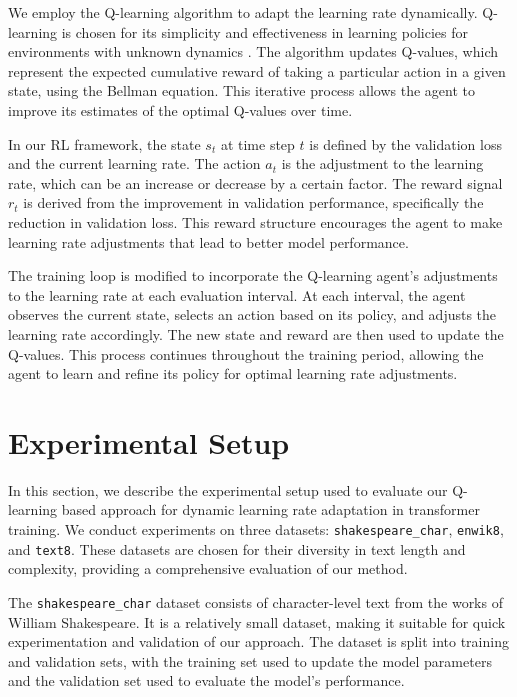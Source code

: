 \documentclass{article} %
\begin{document}
We employ the Q-learning algorithm to adapt the learning rate dynamically. Q-learning is chosen for its simplicity and effectiveness in learning policies for environments with unknown dynamics \citep{goodfellow2016deep}. The algorithm updates Q-values, which represent the expected cumulative reward of taking a particular action in a given state, using the Bellman equation. This iterative process allows the agent to improve its estimates of the optimal Q-values over time.

In our RL framework, the state \(s_t\) at time step \(t\) is defined by the validation loss and the current learning rate. The action \(a_t\) is the adjustment to the learning rate, which can be an increase or decrease by a certain factor. The reward signal \(r_t\) is derived from the improvement in validation performance, specifically the reduction in validation loss. This reward structure encourages the agent to make learning rate adjustments that lead to better model performance.

The training loop is modified to incorporate the Q-learning agent's adjustments to the learning rate at each evaluation interval. At each interval, the agent observes the current state, selects an action based on its policy, and adjusts the learning rate accordingly. The new state and reward are then used to update the Q-values. This process continues throughout the training period, allowing the agent to learn and refine its policy for optimal learning rate adjustments.

\section{Experimental Setup}
\label{sec:experimental}

In this section, we describe the experimental setup used to evaluate our Q-learning based approach for dynamic learning rate adaptation in transformer training. We conduct experiments on three datasets: \texttt{shakespeare\_char}, \texttt{enwik8}, and \texttt{text8}. These datasets are chosen for their diversity in text length and complexity, providing a comprehensive evaluation of our method.

The \texttt{shakespeare\_char} dataset consists of character-level text from the works of William Shakespeare. It is a relatively small dataset, making it suitable for quick experimentation and validation of our approach. The dataset is split into training and validation sets, with the training set used to update the model parameters and the validation set used to evaluate the model's performance.
\end{document}

